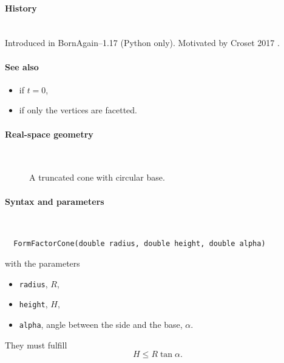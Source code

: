 \paragraph{History}\strut\\
Introduced in BornAgain--1.17 (Python only).
Motivated by Croset 2017 \cite{Cro17}.

\paragraph{See also}
\begin{itemize}
\item {} if $t=0$,
\item {} if only the vertices are facetted.
\end{itemize}


 \label{SCone}

\paragraph{Real-space geometry}\strut\\

\begin{figure}[H]
\hfill
{}
\hfill
{}
\hfill
{}
\hfill
\caption{A truncated cone with circular base.}
\end{figure}

\paragraph{Syntax and parameters}\strut\\[-2ex plus .2ex minus .2ex]
\begin{lstlisting}
  FormFactorCone(double radius, double height, double alpha)
\end{lstlisting}
with the parameters
\begin{itemize}
\item \texttt{radius}, $R$,
\item \texttt{height}, $H$,
\item \texttt{alpha}, angle between the side and the base, $\alpha$.
\end{itemize}
They must fulfill
\begin{displaymath}
  H\le R\tan\alpha.
\end{displaymath}

